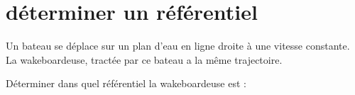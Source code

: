 \section{déterminer un référentiel}

Un bateau se déplace sur un plan d'eau en ligne droite à une vitesse constante.
La wakeboardeuse, tractée par ce bateau a la même trajectoire.
\begin{questions}
	\question Déterminer dans quel référentiel la wakeboardeuse est :
	
\end{questions}